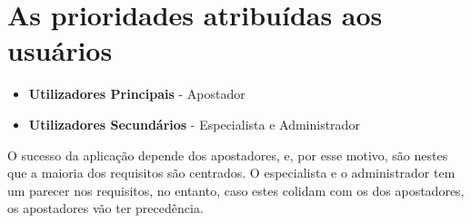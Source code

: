 \section{ As prioridades atribuídas aos usuários}

\begin{itemize}
    \item \textbf{Utilizadores Principais} - Apostador
    \item \textbf{Utilizadores Secundários} - Especialista e Administrador
\end{itemize}

O sucesso da aplicação depende dos apostadores, e, por esse motivo, são nestes que a maioria dos requisitos são centrados.
O especialista e o administrador tem um parecer nos requisitos, no entanto, caso estes colidam com os dos apostadores, os apostadores vão ter precedência.
